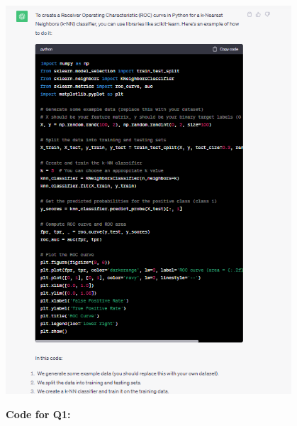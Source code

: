 \documentclass{article}
\begin{document}
\begin{titlepage}
\begin{center}
\includegraphics[width=0.8\textwidth]{q3response.png}
\end{center}

\end{titlepage}
\textbf{Code for Q1:}
\end{document}
